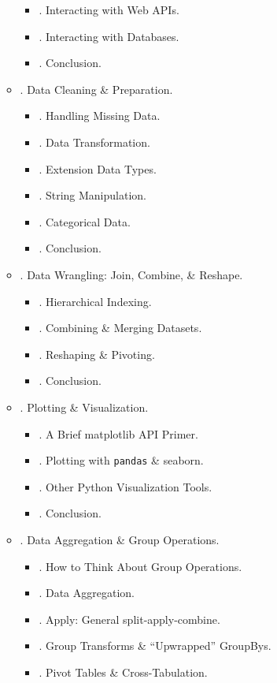 \documentclass{article}
\begin{document}
\begin{enumerate}
\begin{itemize}
\begin{itemize}
			\item {. Interacting with Web APIs.}
			\item {. Interacting with Databases.}
			\item {. Conclusion.}
		\end{itemize}
		\item {. Data Cleaning \& Preparation.}
		\begin{itemize}
			\item {. Handling Missing Data.}
			\item {. Data Transformation.}
			\item {. Extension Data Types.}
			\item {. String Manipulation.}
			\item {. Categorical Data.}
			\item {. Conclusion.}
		\end{itemize}
		\item {. Data Wrangling: Join, Combine, \& Reshape.}
		\begin{itemize}
			\item {. Hierarchical Indexing.}
			\item {. Combining \& Merging Datasets.}
			\item {. Reshaping \& Pivoting.}
			\item {. Conclusion.}
		\end{itemize}
		\item {. Plotting \& Visualization.}
		\begin{itemize}
			\item {. A Brief matplotlib API Primer.}
			\item {. Plotting with {\tt pandas} \& seaborn.}
			\item {. Other Python Visualization Tools.}
			\item {. Conclusion.}
		\end{itemize}
		\item {. Data Aggregation \& Group Operations.}
		\begin{itemize}
			\item {. How to Think About Group Operations.}
			\item {. Data Aggregation.}
			\item {. Apply: General split-apply-combine.}
			\item {. Group Transforms \& ``Upwrapped'' GroupBys.}
			\item {. Pivot Tables \& Cross-Tabulation.}

\end{itemize}
\end{itemize}
\end{enumerate}
\end{document}
